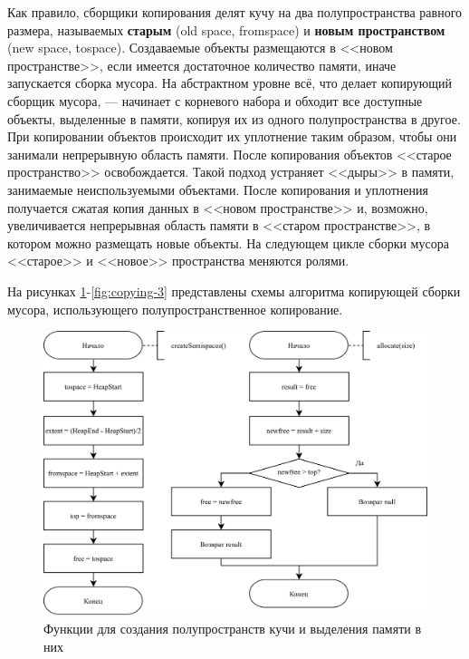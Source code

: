 Как правило, сборщики копирования делят кучу на два полупространства равного размера, называемых \textbf{старым} (old space, fromspace) и \textbf{новым пространством} (new space, tospace). Создаваемые объекты размещаются в <<новом пространстве>>, если имеется достаточное количество памяти, иначе запускается сборка мусора. На абстрактном уровне всё, что делает копирующий сборщик мусора, --- начинает с корневого набора и обходит все доступные объекты, выделенные в памяти, копируя их из одного полупространства в другое. При копировании объектов происходит их уплотнение таким образом, чтобы они занимали непрерывную область памяти. После копирования объектов <<старое пространство>> освобождается. Такой подход устраняет <<дыры>> в памяти, занимаемые неиспользуемыми объектами. После копирования и уплотнения получается сжатая копия данных в <<новом пространстве>> и, возможно, увеличивается непрерывная область памяти в <<старом пространстве>>, в котором можно размещать новые объекты. На следующем цикле сборки мусора <<старое>> и <<новое>> пространства меняются ролями. \cite{handbook} \cite{cornell3}

На рисунках \ref{fig:copying-1}-\ref{fig:copying-3} представлены схемы алгоритма копирующей сборки мусора, использующего полупространственное копирование. \cite{handbook}

\begin{figure}[H]
	\centering
	\includegraphics[scale=0.175]{assets/copying-1.png}
	\caption{Функции для создания полупространств кучи и выделения памяти в них}
	\label{fig:copying-1}
\end{figure}

